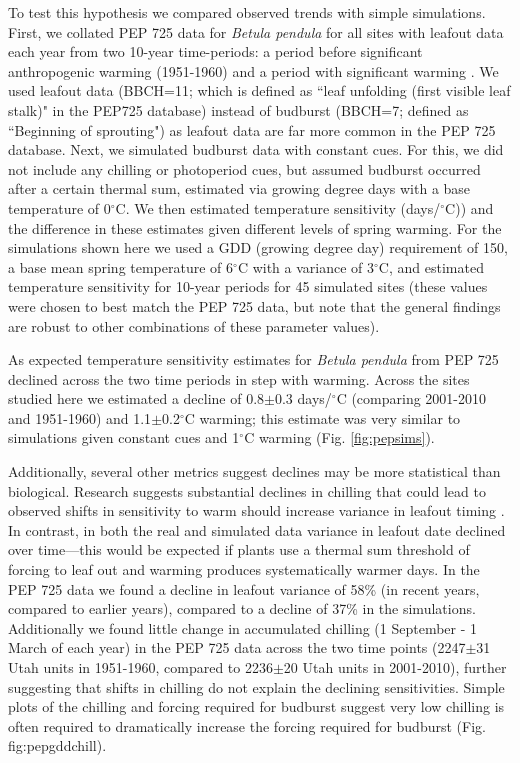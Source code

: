 \documentclass{article}
\begin{document}
\par To test this hypothesis we compared observed trends with simple simulations. First, we collated PEP 725 data \citep{Templ2018} for \emph{Betula pendula} for all sites with leafout data each year from two 10-year time-periods: a period before significant anthropogenic warming (1951-1960) and a period with significant warming \citep[2001-2010, see][]{IPCC:2014sm}. We used leafout data (BBCH=11; which is defined as ``leaf unfolding (first visible leaf stalk)" in the PEP725 database) instead of budburst (BBCH=7; defined as ``Beginning of sprouting") as leafout data are far more common in the PEP 725 database. Next, we simulated budburst data with constant cues. For this, we did not include any chilling or photoperiod cues, but assumed budburst occurred after a certain thermal sum, estimated via growing degree days with a base temperature of 0$^{\circ}$C. We then estimated temperature sensitivity (days/$^{\circ}$C)) and the difference in these estimates given different levels of spring warming. For the simulations shown here we used a GDD (growing degree day) requirement of 150, a base mean spring temperature of 6$^{\circ}$C with a variance of 3$^{\circ}$C, and estimated temperature sensitivity for 10-year periods for 45 simulated sites (these values were chosen to best match the PEP 725 data, but note that the general findings are robust to other combinations of these parameter values).

\par As expected temperature sensitivity estimates for \emph{Betula pendula} from PEP 725 declined across the two time periods in step with warming. Across the sites studied here we estimated a decline of 0.8$\pm$0.3 days/$^{\circ}$C (comparing 2001-2010 and 1951-1960) and 1.1$\pm$0.2$^{\circ}$C warming; this estimate was very similar to simulations given constant cues and 1$^{\circ}$C warming (Fig. \ref{fig:pepsims}). 

\par Additionally, several other metrics suggest declines may be more statistical than biological. Research suggests substantial declines in chilling that could lead to observed shifts in sensitivity to warm should increase variance in leafout timing \citep{ford2016}. In contrast, in both the real and simulated data variance in leafout date declined over time---this would be expected if plants use a thermal sum threshold of forcing to leaf out and warming produces systematically warmer days. In the PEP 725 data we found a decline in leafout variance of 58\% (in recent years, compared to earlier years), compared to a decline of 37\% in the simulations. Additionally we found little change in accumulated chilling (1 September - 1 March of each year) in the PEP 725 data across the two time points (2247$\pm$31 Utah units in 1951-1960, compared to 2236$\pm$20 Utah units in 2001-2010), further suggesting that shifts in chilling do not explain the declining sensitivities. Simple plots of the chilling and forcing required for budburst suggest very low chilling is often required to dramatically increase the forcing required for budburst (Fig. {fig:pepgddchill}). 
\end{document}
